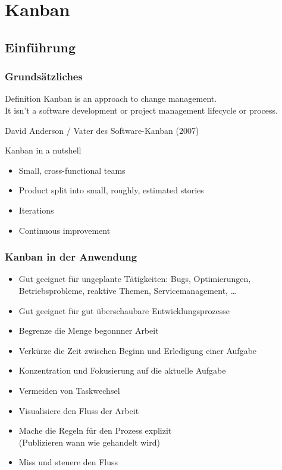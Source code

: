 \section{Kanban}

\subsection{Einführung}

\frame
{
  \frametitle{Grundsätzliches}
  \begin{block}{Definition}
  Kanban is an approach to change management. \\
\smallskip
  It isn’t a software development or project management lifecycle or process.
    \begin{flushright}
    David Anderson / Vater des Software-Kanban (2007)
    \end{flushright}
    \end{block}
  \begin{block}{Kanban in a nutshell}
  \begin{itemize}
      \item{Small, cross-functional teams}
      \item{Product split into small, roughly, estimated stories}
      \item{Iterations}
      \item{Continuous improvement}
  \end{itemize}
    \end{block}

}


\frame
{
  \frametitle{Kanban in der Anwendung}
  \begin{itemize}
    \item{Gut geeignet für ungeplante Tätigkeiten: Bugs, Optimierungen, Betriebsprobleme, reaktive Themen, Servicemanagement, \dots}
    \item{Gut geeignet für gut überschaubare Entwicklungsprozesse}
    \item{Begrenze die Menge begonnner Arbeit}
    \item{Verkürze die Zeit zwischen Beginn und Erledigung einer Aufgabe}
    \item{Konzentration und Fokusierung auf die aktuelle Aufgabe}
    \item{Vermeiden von Taskwechsel}
    \item{Visualisiere den Fluss der Arbeit}
    \item{Mache die Regeln für den Prozess explizit\\
      (Publizieren wann wie gehandelt wird)
    }
    \item{Miss und steuere den Fluss}
  \end{itemize}
}


